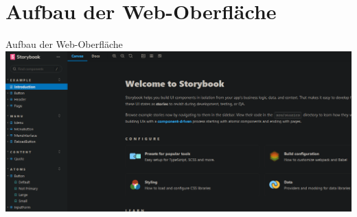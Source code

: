 \documentclass{beamer}
\begin{document}
\section{Aufbau der Web-Oberfläche} %

\begin{frame}{Aufbau der Web-Oberfläche}
	\includegraphics[width=\textwidth]{Images/web-ui/whole-ui.png}
\end{frame}
\end{document}
